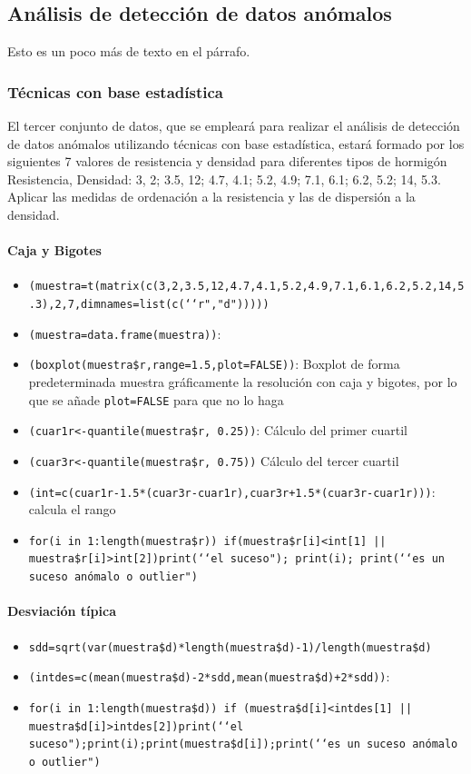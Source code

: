 \documentclass[a4paper, 12pt]{article}
\begin{document}
	\subsection{Análisis de detección de datos anómalos}
	Esto es un poco más de texto en el párrafo.
	
	\subsubsection{Técnicas con base estadística}
	El tercer conjunto de datos, que se empleará para realizar el análisis de detección de datos anómalos utilizando técnicas con base estadística, estará formado por los siguientes 7 valores de resistencia y densidad para diferentes tipos de hormigón {Resistencia, Densidad}: {3, 2; 3.5, 12; 4.7, 4.1; 5.2, 4.9; 7.1, 6.1; 6.2, 5.2; 14, 5.3}. Aplicar las medidas de ordenación a la resistencia y las de dispersión a la densidad.
	
	\paragraph{Caja y Bigotes}
	\begin{itemize}
		\item \texttt{(muestra=t(matrix(c(3,2,3.5,12,4.7,4.1,5.2,4.9,7.1,6.1,6.2,5.2,14,5.3),2,7,dimnames=list(c(‘‘r","d")))))}
		\item \texttt{(muestra=data.frame(muestra))}: 
		\item \texttt{(boxplot(muestra\$r,range=1.5,plot=FALSE))}: Boxplot de forma predeterminada muestra gráficamente la resolución con caja y bigotes, por lo que se añade \texttt{plot=FALSE} para que no lo haga
		\item \texttt{(cuar1r<-quantile(muestra\$r, 0.25))}: Cálculo del primer cuartil
		\item \texttt{(cuar3r<-quantile(muestra\$r, 0.75))} Cálculo del tercer cuartil
		\item \texttt{(int=c(cuar1r-1.5*(cuar3r-cuar1r),cuar3r+1.5*(cuar3r-cuar1r)))}: calcula el rango
		\item \texttt{for(i in 1:length(muestra\$r)) {if(muestra\$r[i]<int[1] || muestra\$r[i]>int[2]){print(‘‘el suceso"); print(i); print(‘‘es un suceso anómalo o outlier")}}}
	\end{itemize}
	
	\paragraph{Desviación típica}
	\begin{itemize}
		\item \texttt{sdd=sqrt(var(muestra\$d)*length(muestra\$d)-1)/length(muestra\$d)}
		\item \texttt{(intdes=c(mean(muestra\$d)-2*sdd,mean(muestra\$d)+2*sdd))}: 
		\item \texttt{for(i in 1:length(muestra\$d)) {if (muestra\$d[i]<intdes[1] || muestra\$d[i]>intdes[2]){print(‘‘el suceso");print(i);print(muestra\$d[i]);print(‘‘es un suceso anómalo o outlier")}}}
	\end{itemize}
	
\end{document}
